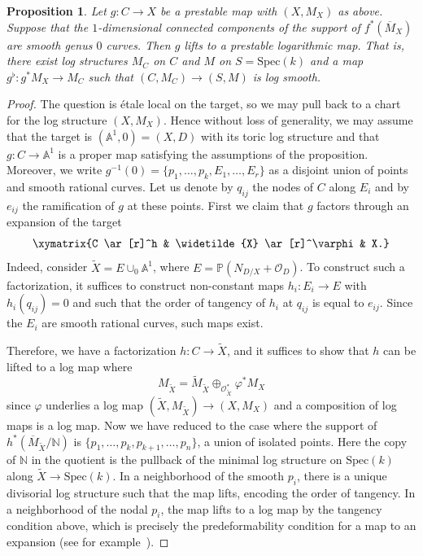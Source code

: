 \documentclass[11pt]{amsart}
\numberwithin{equation}{section}
\newtheorem{proposition}[theorem]{Proposition}
\theoremstyle{definition}
\theoremstyle{remark}
\newcommand{\calO}{\mathcal O}
\newcommand{\Spec}{\mathrm{Spec}}
\begin{document}
\begin{proposition}\label{prop:liftmap} Let $g \colon  C \to X$ be a prestable map with $(X, M_X)$ as above. Suppose that the $1$-dimensional connected components of the support of $f^{*}(\overline{M}_X)$ are smooth genus $0$ curves. Then $g$ lifts to a  prestable logarithmic map. That is, there exist log structures $M_C$ on $C$ and $M$ on $S = \Spec(k)$ and a map $g^\flat \colon  g^*M_X \to M_C$ such that $(C,M_C) \to (S,M)$ is log smooth. 
\end{proposition}

\begin{proof} The question is \'etale local on the target, so we may pull back to a chart for the log structure $(X,M_X)$. Hence without loss of generality, we may assume that the target is $(\mathbb{A}^1,0) = (X,D)$ with its toric log structure and that $g \colon  C \to \mathbb{A}^1$ is a proper map satisfying the assumptions of the proposition. Moreover, we write $g^{-1}(0) = \{p_1, \ldots, p_k, E_1, \ldots, E_r\}$ as a disjoint union of points and smooth rational curves. Let us denote by $q_{ij}$ the nodes of $C$ along $E_i$ and by $e_{ij}$ the ramification of $g$ at these points. First we claim that $g$ factors through an expansion of the target 
$$
\xymatrix{C \ar[r]^h & \widetilde{X} \ar[r]^\varphi & X.}
$$
Indeed, consider $\widetilde{X} = E \cup_0 \mathbb{A}^1$, where $E = \mathbb{P}(N_{D/X} + \calO_D)$. To construct such a factorization, it suffices to construct non-constant maps $h_i \colon  E_i \to E$ with $h_i(q_{ij}) = 0$ and such that the order of tangency of $h_i$ at $q_{ij}$ is equal to $e_{ij}$. Since the $E_i$ are smooth rational curves, such maps exist. 

Therefore, we have a factorization $h \colon  C \to \widetilde{X}$, and it suffices to show that $h$ can be lifted to a log map where 
$$
M_{\widetilde{X}} = \widetilde{M}_{\widetilde{X}} \oplus_{\calO_{\widetilde{X}}^*} \varphi^*M_X
$$
since $\varphi$ underlies a log map $(\widetilde{X}, M_{\widetilde{X}}) \to (X, M_X)$ and a composition of log maps is a log map. Now we have reduced to the case where the support of $h^*(\overline{M}_{\widetilde{X}}/\mathbb{N})$ is $\{p_1, \ldots, p_k, p_{k + 1}, \ldots, p_n\}$, a union of isolated points. Here the copy of $\mathbb{N}$ in the quotient is the pullback of the minimal log structure on $\Spec(k)$ along $\tilde{X} \to \Spec(k)$. In a neighborhood of the smooth $p_i$, there is a unique divisorial log structure such that the map lifts, encoding the order of tangency. In a neighborhood of the nodal $p_i$, the map lifts to a log map by the tangency condition above, which is precisely the predeformability condition for a map to an expansion (see for example~\cite[Section 12]{HoM}). \end{proof}
\end{document}

